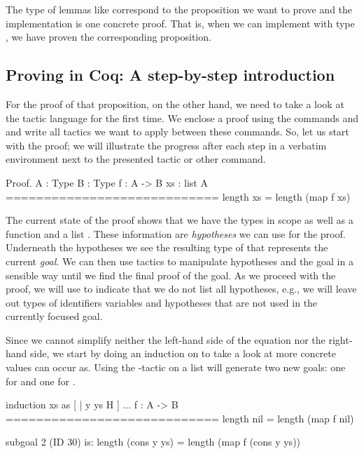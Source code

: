 The type of lemmas like  correspond to the proposition we want to prove and the implementation is one concrete proof.
That is, when we can implement  with type , we have proven the corresponding proposition.

\subsection{Proving in Coq: A step-by-step introduction}
For the proof of that proposition, on the other hand, we need to take a look at the tactic language  for the first time.
We enclose a proof using the commands  and  and write all tactics we want to apply between these commands.
So, let us start with the proof; we will illustrate the progress after each step in a verbatim environment next to the presented tactic or other command.

\begin{cproof}{Proof.}
  A : Type
  B : Type
  f : A -> B
  xs : list A
  ============================
  length xs = length (map f xs)
\end{cproof}

The current state of the proof shows that we have the types  in scope as well as a function  and a list .
These information are \emph{hypotheses} we can use for the proof.
Underneath the hypotheses we see the resulting type of  that represents the current \emph{goal}.
We can then use tactics to manipulate hypotheses and the goal in a sensible way until we find the final proof of the goal.
 As we proceed with the proof, we will use  to indicate that we do not list all hypotheses, e.g., we will leave out types of identifiers variables and hypotheses that are not used in the currently focused goal.

Since we cannot simplify neither the left-hand side of the equation nor the right-hand side, we start by doing an induction on  to take a look at more concrete values  can occur as.
Using the -tactic on a list will generate two new goals: one for  and one for .

\begin{cproof}{induction xs as [ | y ys H ]}
  ...
  f : A -> B
  ============================
  length nil = length (map f nil)

subgoal 2 (ID 30) is:
length (cons y ys) =
length (map f (cons y ys))
\end{cproof}

